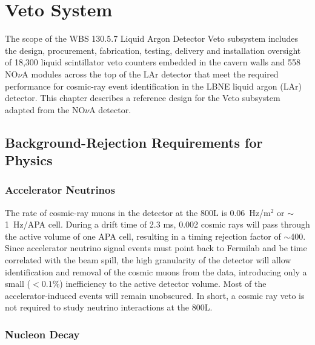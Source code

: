 %
%


\def\NOvA{NO$\nu$A }
\chapter{Veto System}
\label{ch:veto}


The scope of the WBS 130.5.7 Liquid Argon Detector Veto subsystem includes the design, procurement, fabrication, testing, delivery and installation oversight of 18,300 liquid scintillator veto counters embedded in the cavern walls and 558 \NOvA modules across the top of the LAr detector that meet the required performance for cosmic-ray event identification in the LBNE liquid argon (LAr) detector.  This chapter describes a reference design for the Veto subsystem adapted from the NO$\nu$A  detector.

\section{Background-Rejection Requirements for Physics}

\subsection{Accelerator Neutrinos}

The rate of cosmic-ray muons in the detector at the 800L is 0.06~Hz/m$^2$ or $\sim$ 1~Hz/APA cell. During a drift time of 2.3 ms, 0.002 cosmic rays will pass through the active volume of one APA cell, resulting in a timing rejection factor of $\sim$400. Since accelerator neutrino signal events must point back to Fermilab and be time correlated with the beam spill, the high granularity of the detector will allow identification and removal of the cosmic muons from the data, introducing only a small ($< 0.1$\%) inefficiency to the active detector volume.  Most of the accelerator-induced events will remain unobscured.  In short, a cosmic ray veto is not required to study neutrino interactions at the 800L.

\subsection{Nucleon Decay}

